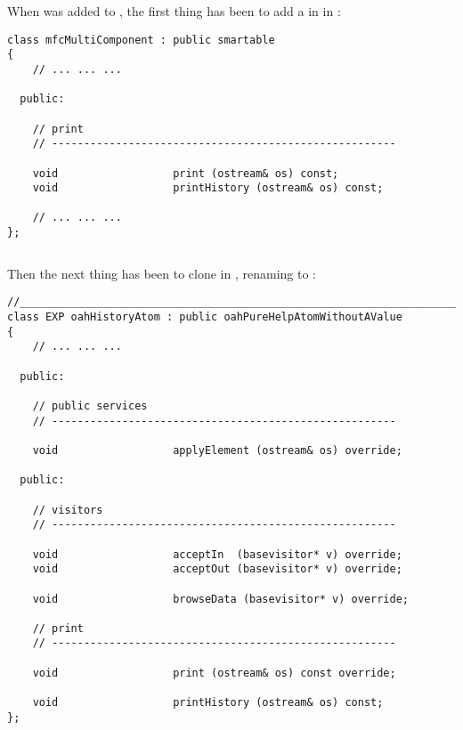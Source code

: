 When  was added to \oahRepr, the first thing has been to add a  in  in :
\begin{lstlisting}[language=CPlusPlus]
class mfcMultiComponent : public smartable
{
	// ... ... ...

  public:

    // print
    // ------------------------------------------------------

    void                  print (ostream& os) const;
    void                  printHistory (ostream& os) const;

	// ... ... ...
};
\end{lstlisting}

\begin{lstlisting}[language=CPlusPlus]

\end{lstlisting}

Then the next thing has been to clone  in , renaming  to :
\begin{lstlisting}[language=CPlusPlus]
//______________________________________________________________________________
class EXP oahHistoryAtom : public oahPureHelpAtomWithoutAValue
{
	// ... ... ...

  public:

    // public services
    // ------------------------------------------------------

    void                  applyElement (ostream& os) override;

  public:

    // visitors
    // ------------------------------------------------------

    void                  acceptIn  (basevisitor* v) override;
    void                  acceptOut (basevisitor* v) override;

    void                  browseData (basevisitor* v) override;

    // print
    // ------------------------------------------------------

    void                  print (ostream& os) const override;

    void                  printHistory (ostream& os) const;
};
\end{lstlisting}

